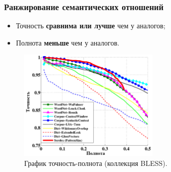 \begin{frame}
\frametitle{Ранжирование семантических отношений}

\begin{itemize}
  \item Точность \textbf{сравнима или лучше} чем у аналогов;
  \item Полнота \textbf{меньше} чем у аналогов.
\end{itemize}

\begin{figure}  
    \centering
    \includegraphics[width=0.6\textwidth]{pr}
    \caption{График точность-полнота (коллекция BLESS).
    }
\end{figure}

\end{frame}








